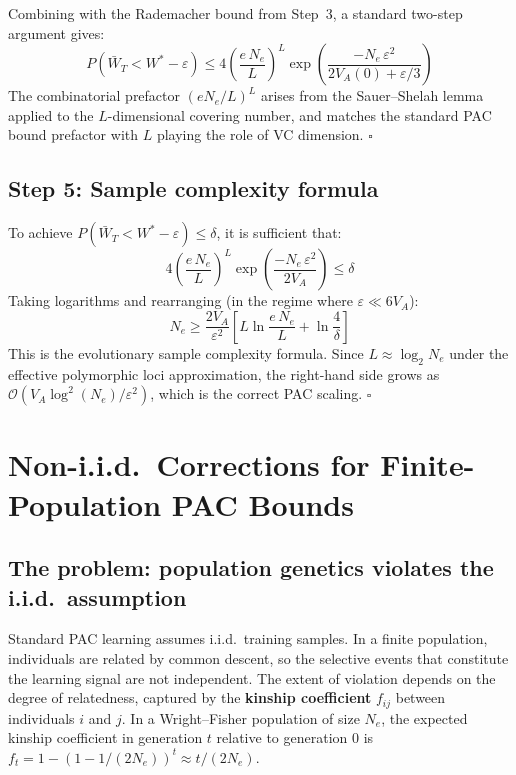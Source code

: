 \documentclass[12pt]{article}
\theoremstyle{remark}
\begin{document}
Combining with the Rademacher bound from Step~3, a standard two-step argument gives:
\[
  P\!\left(\bar{W}_T < W^* - \varepsilon\right)
  \leq 4\left(\frac{e\,N_e}{L}\right)^L
  \exp\!\left(\frac{-N_e\,\varepsilon^2}{2V_A(0) + \varepsilon/3}\right)
\]
The combinatorial prefactor $(eN_e/L)^L$ arises from the Sauer--Shelah lemma applied to the $L$-dimensional covering number, and matches the standard PAC bound prefactor with $L$ playing the role of VC dimension. $\square$

\subsection{Step 5: Sample complexity formula}

To achieve $P(\bar{W}_T < W^* - \varepsilon) \leq \delta$, it is sufficient that:
\[
  4\left(\frac{e\,N_e}{L}\right)^L \exp\!\left(\frac{-N_e\,\varepsilon^2}{2V_A}\right) \leq \delta
\]
Taking logarithms and rearranging (in the regime where $\varepsilon \ll 6V_A$):
\[
  N_e \geq \frac{2V_A}{\varepsilon^2}\left[L\ln\frac{e\,N_e}{L} + \ln\frac{4}{\delta}\right]
\]
This is the evolutionary sample complexity formula. Since $L \approx \log_2 N_e$ under the effective polymorphic loci approximation, the right-hand side grows as $\mathcal{O}(V_A \log^2(N_e)/\varepsilon^2)$, which is the correct PAC scaling. $\square$

\section{Non-i.i.d.\ Corrections for Finite-Population PAC Bounds}

\subsection{The problem: population genetics violates the i.i.d.\ assumption}

Standard PAC learning assumes i.i.d.\ training samples. In a finite population, individuals are related by common descent, so the selective events that constitute the learning signal are not independent. The extent of violation depends on the degree of relatedness, captured by the \textbf{kinship coefficient} $f_{ij}$ between individuals $i$ and $j$. In a Wright--Fisher population of size $N_e$, the expected kinship coefficient in generation $t$ relative to generation 0 is $f_t = 1 - (1 - 1/(2N_e))^t \approx t/(2N_e)$.
\end{document}
